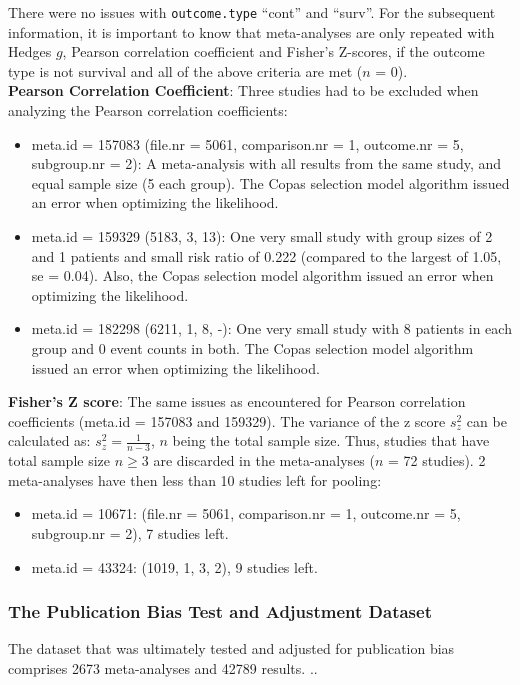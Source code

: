 \documentclass[11pt,a4paper,twoside]{book}\usepackage[]{graphicx}\usepackage[]{color}
\begin{document}
There were no issues with \texttt{outcome.type} ``cont'' and ``surv''. For the subsequent information, it is important to know that meta-analyses are only repeated with Hedges $g$, Pearson correlation coefficient and Fisher's Z-scores, if the outcome type is not survival and all of the above criteria are met ($n$ = 0). \\
\textbf{Pearson Correlation Coefficient}: Three studies had to be excluded when analyzing the Pearson correlation coefficients:
\begin{itemize}
\item meta.id = 157083 (file.nr = 5061, comparison.nr = 1, outcome.nr = 5, subgroup.nr = 2): A meta-analysis with all results from the same study, and equal sample size (5 each group). The Copas selection model algorithm issued an error when optimizing the likelihood.
\item meta.id = 159329 (5183, 3, 13): One very small study with group sizes of 2 and 1 patients and small risk ratio of 0.222 (compared to the largest of 1.05, se = 0.04). Also, the Copas selection model algorithm issued an error when optimizing the likelihood.
\item meta.id = 182298 (6211, 1, 8, -): One very small study with 8 patients in each group and 0 event counts in both. The Copas selection model algorithm issued an error when optimizing the likelihood.
\end{itemize}

\textbf{Fisher's Z score}: The same issues as encountered for Pearson correlation coefficients (meta.id = 157083 and 159329). The variance of the z score $s_z^2$ can be calculated as:  $s_z^2 = \frac{1}{n-3}$, $n$ being the total sample size. Thus, studies that have total sample size $n \geq 3$ are discarded in the meta-analyses ($n$ = 72 studies). 2 meta-analyses have then less than 10 studies left for pooling: 
\begin{itemize}
\item meta.id = 10671: (file.nr = 5061, comparison.nr = 1, outcome.nr = 5, subgroup.nr = 2), 7 studies left.
\item meta.id = 43324: (1019, 1, 3, 2), 9 studies left.
\end{itemize}

\subsubsection{The Publication Bias Test and Adjustment Dataset}
The dataset that was ultimately tested and adjusted for publication bias comprises 2673 meta-analyses and 42789 results. ..
\end{document}
